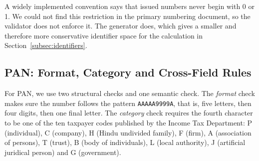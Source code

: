 \documentclass[VANCOUVER,Times1COL]{WileyNJDv5}
\begin{document}
A widely implemented convention says that issued numbers never begin
with 0 or 1. We could not find this restriction in the primary
numbering document, so the validator does not enforce it. The generator
does, which gives a smaller and therefore more conservative identifier
space for the calculation in Section~\ref{subsec:identifiers}.

\subsection{PAN: Format, Category and Cross-Field Rules}
\label{sec:pan-validation}

For PAN, we use two structural checks and one semantic check. The \emph{format} check makes sure the number follows the pattern \texttt{AAAAA9999A}, that is, five letters, then four digits, then one final letter. The \emph{category} check requires
the fourth character to be one of the ten taxpayer codes published by
the Income Tax Department\cite{itd-pan}: P (individual), C (company),
H (Hindu undivided family), F (firm), A (association of persons),
T (trust), B (body of individuals), L (local authority), J (artificial
juridical person) and G (government).
\end{document}

